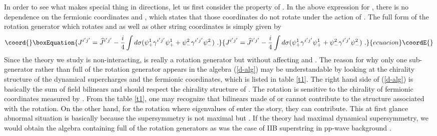 \documentclass[a4paper,12pt]{article}
\begin{document}
In order to see what makes special thing in \coordHE{} directions,
let us first consider the property of \coordHE{}.  In the
above expression for \coordHE{}, there is no dependence on
the fermionic coordinates \coordHE{} and \coordHE{}, which states that
those coordinates do not rotate under the action of
\coordHE{}.  The full form of the rotation generator
\coordHE{} which rotates \coordHE{} and \coordHE{} as well as other
string coordinates is simply given by
\begin{equation}\coord{}\boxEquation{
J^{i'j'} =
\widehat{J}^{i'j'} 
- \frac{i}{4} \int d \sigma ( \psi^1_+ \gamma^{i'j'}
 \psi^1_+ + \psi^2_- \gamma^{i'j'} \psi^2_- ) ~.
}{
J^{i'j'} =
\widehat{J}^{i'j'} 
- \frac{i}{4} \int d \sigma ( \psi^1_+ \gamma^{i'j'}
 \psi^1_+ + \psi^2_- \gamma^{i'j'} \psi^2_- ) ~.
}{ecuacion}\coordE{}\end{equation}
Since the theory we study is non-interacting, \coordHE{} is
really a rotation generator but without affecting \coordHE{} and
\coordHE{}.  The reason for why only one sub-generator rather than
full of the rotation generator \coordHE{} appears in the algebra
(\ref{d-alg}) may be understandable by looking at the chirality
structure of the dynamical supercharges and the fermionic coordinates,
which is listed in table \ref{t1}.  The right hand side of
(\ref{d-alg}) is basically the sum of field bilinears and should
respect the chirality structure of \coordHE{}.  The \coordHE{}
rotation is sensitive to the chirality of fermionic coordinates
measured by \coordHE{}.  From the table \ref{t1}, one may
recognize that bilinears made of \coordHE{} or \coordHE{} cannot
contribute to the structure associated with the \coordHE{} rotation.  On
the other hand, for the \coordHE{} rotation where eigenvalues of
\coordHE{} enter the story, they can contribute.  This at first
glance abnormal situation is basically because the supersymmetry is
not maximal but \coordHE{}.  If the theory had maximal dynamical
supersymmetry, we would obtain the algebra containing full of the
rotation generators as was the case of IIB superstring in pp-wave
background \cite{met044}.
\end{document}
